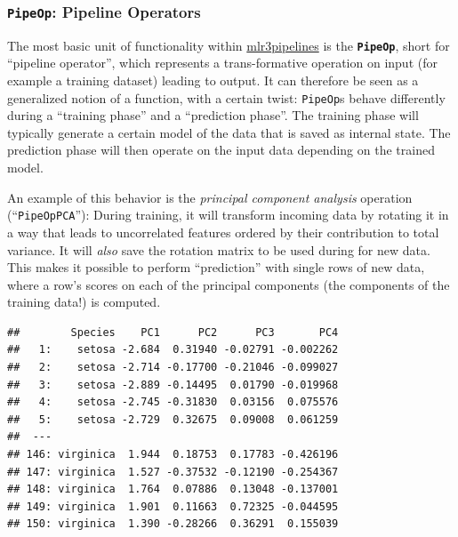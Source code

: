 \documentclass[]{article}
\newenvironment{Shaded}{\begin{snugshade}}{\end{snugshade}}
\newcommand{\DecValTok}[1]{\textcolor[rgb]{0.00,0.00,0.81}{#1}}
\newcommand{\KeywordTok}[1]{\textcolor[rgb]{0.13,0.29,0.53}{\textbf{#1}}}
\newcommand{\NormalTok}[1]{#1}
\newcommand{\OperatorTok}[1]{\textcolor[rgb]{0.81,0.36,0.00}{\textbf{#1}}}
\newcommand{\StringTok}[1]{\textcolor[rgb]{0.31,0.60,0.02}{#1}}
\renewenvironment{Shaded} {\begin{snugshade}\small} {\end{snugshade}}
\begin{document}
\hypertarget{pipeop-pipeline-operators}{%
\subsubsection{\texorpdfstring{\texttt{PipeOp}: Pipeline Operators}{PipeOp: Pipeline Operators}}\label{pipeop-pipeline-operators}}

The most basic unit of functionality within \href{https://cran.r-project.org/package=mlr3pipelines}{mlr3pipelines} is the \textbf{\texttt{PipeOp}}, short for ``pipeline operator'', which represents a trans-formative operation on input (for example a training dataset) leading to output.
It can therefore be seen as a generalized notion of a function, with a certain twist: \texttt{PipeOp}s behave differently during a ``training phase'' and a ``prediction phase''.
The training phase will typically generate a certain model of the data that is saved as internal state.
The prediction phase will then operate on the input data depending on the trained model.

An example of this behavior is the \emph{principal component analysis} operation (``\texttt{PipeOpPCA}''):
During training, it will transform incoming data by rotating it in a way that leads to uncorrelated features ordered by their contribution to total variance.
It will \emph{also} save the rotation matrix to be used during for new data.
This makes it possible to perform ``prediction'' with single rows of new data, where a row's scores on each of the principal components (the components of the training data!) is computed.

\begin{Shaded}
\end{Shaded}

\begin{verbatim}
##        Species    PC1      PC2      PC3       PC4
##   1:    setosa -2.684  0.31940 -0.02791 -0.002262
##   2:    setosa -2.714 -0.17700 -0.21046 -0.099027
##   3:    setosa -2.889 -0.14495  0.01790 -0.019968
##   4:    setosa -2.745 -0.31830  0.03156  0.075576
##   5:    setosa -2.729  0.32675  0.09008  0.061259
##  ---                                             
## 146: virginica  1.944  0.18753  0.17783 -0.426196
## 147: virginica  1.527 -0.37532 -0.12190 -0.254367
## 148: virginica  1.764  0.07886  0.13048 -0.137001
## 149: virginica  1.901  0.11663  0.72325 -0.044595
## 150: virginica  1.390 -0.28266  0.36291  0.155039
\end{verbatim}
\end{document}
